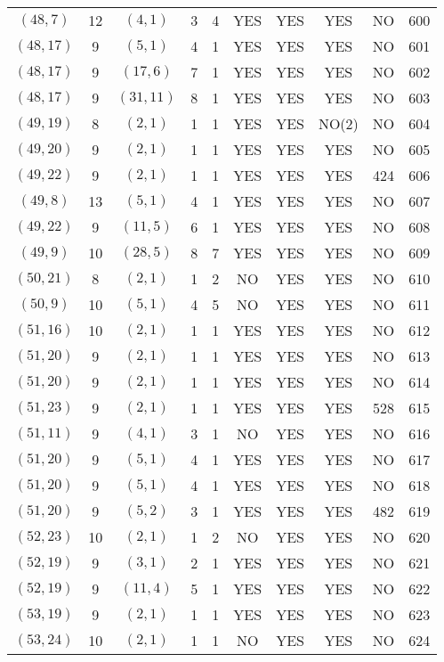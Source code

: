 \begin{longtable}{|c|c|c|c|c|c|c|c|c|c|}
$(48, 7)$ & 12 & $(4, 1)$ & 3 & 4 & YES & YES & YES & NO & 600\\
$(48, 17)$ & 9 & $(5, 1)$ & 4 & 1 & YES & YES & YES & NO & 601\\
$(48, 17)$ & 9 & $(17, 6)$ & 7 & 1 & YES & YES & YES & NO & 602\\
$(48, 17)$ & 9 & $(31, 11)$ & 8 & 1 & YES & YES & YES & NO & 603\\
$(49, 19)$ & 8 & $(2, 1)$ & 1 & 1 & YES & YES & NO(2) & NO & 604\\
$(49, 20)$ & 9 & $(2, 1)$ & 1 & 1 & YES & YES & YES & NO & 605\\
$(49, 22)$ & 9 & $(2, 1)$ & 1 & 1 & YES & YES & YES & 424 & 606\\
$(49, 8)$ & 13 & $(5, 1)$ & 4 & 1 & YES & YES & YES & NO & 607\\
$(49, 22)$ & 9 & $(11, 5)$ & 6 & 1 & YES & YES & YES & NO & 608\\
$(49, 9)$ & 10 & $(28, 5)$ & 8 & 7 & YES & YES & YES & NO & 609\\
$(50, 21)$ & 8 & $(2, 1)$ & 1 & 2 & NO & YES & YES & NO & 610\\
$(50, 9)$ & 10 & $(5, 1)$ & 4 & 5 & NO & YES & YES & NO & 611\\
$(51, 16)$ & 10 & $(2, 1)$ & 1 & 1 & YES & YES & YES & NO & 612\\
$(51, 20)$ & 9 & $(2, 1)$ & 1 & 1 & YES & YES & YES & NO & 613\\
$(51, 20)$ & 9 & $(2, 1)$ & 1 & 1 & YES & YES & YES & NO & 614\\
$(51, 23)$ & 9 & $(2, 1)$ & 1 & 1 & YES & YES & YES & 528 & 615\\
$(51, 11)$ & 9 & $(4, 1)$ & 3 & 1 & NO & YES & YES & NO & 616\\
$(51, 20)$ & 9 & $(5, 1)$ & 4 & 1 & YES & YES & YES & NO & 617\\
$(51, 20)$ & 9 & $(5, 1)$ & 4 & 1 & YES & YES & YES & NO & 618\\
$(51, 20)$ & 9 & $(5, 2)$ & 3 & 1 & YES & YES & YES & 482 & 619\\
$(52, 23)$ & 10 & $(2, 1)$ & 1 & 2 & NO & YES & YES & NO & 620\\
$(52, 19)$ & 9 & $(3, 1)$ & 2 & 1 & YES & YES & YES & NO & 621\\
$(52, 19)$ & 9 & $(11, 4)$ & 5 & 1 & YES & YES & YES & NO & 622\\
$(53, 19)$ & 9 & $(2, 1)$ & 1 & 1 & YES & YES & YES & NO & 623\\
$(53, 24)$ & 10 & $(2, 1)$ & 1 & 1 & NO & YES & YES & NO & 624\\

\end{longtable}
